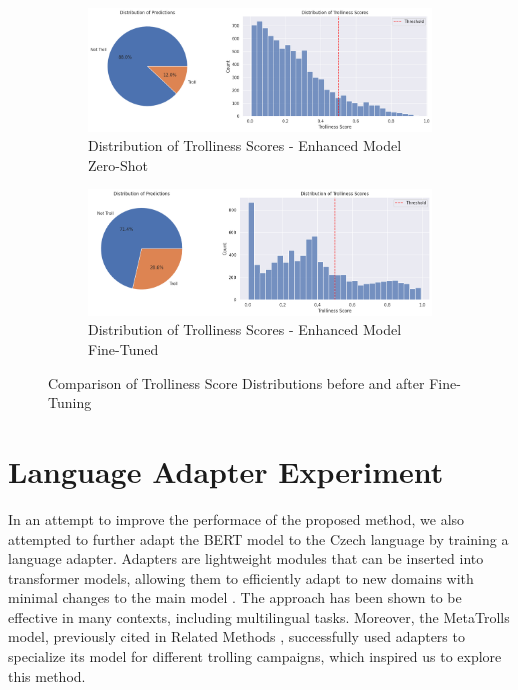 \documentclass[twoside]{ctuthesis}
\theoremstyle{plain}
\theoremstyle{definition}
\theoremstyle{note}
\begin{document}
\begin{figure}[H]
    \centering
    \begin{subfigure}{0.8\linewidth}
        \centering
        \includegraphics[width=\linewidth]{figures/distribution_enhanced.png}
        \caption{Distribution of Trolliness Scores - Enhanced Model Zero-Shot}
        \label{fig:distribution_enhanced}
    \end{subfigure}

    \vspace{1em}

    \begin{subfigure}{0.8\linewidth}
        \centering
        \includegraphics[width=\linewidth]{figures/distribution_enhanced_finetuned.png}
        \caption{Distribution of Trolliness Scores - Enhanced Model Fine-Tuned}
        \label{fig:distribution_enhanced_finetuned}
    \end{subfigure}

    \caption{Comparison of Trolliness Score Distributions before and after Fine-Tuning}
    \label{fig:distribution_comparison_enhanced}
\end{figure}

\section{Language Adapter Experiment}
In an attempt to improve the performace of the proposed method, we also attempted to further adapt the BERT model to the Czech language by training a language adapter. Adapters are lightweight modules that can be inserted into transformer models, allowing them to efficiently adapt to new domains with minimal changes to the main model \cite{Houlsby2019}. The approach has been shown to be effective in many contexts, including multilingual tasks. Moreover, the MetaTrolls model, previously cited in Related Methods \cite{Tian2023}, successfully used adapters to specialize its model for different trolling campaigns, which inspired us to explore this method.\par
\end{document}
